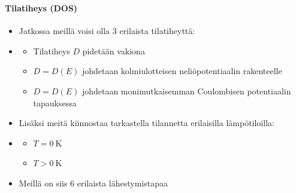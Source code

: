 \begin{frame}
\frametitle{\texorpdfstring{\culine[\sectiontitleulinecolor]{\sectiontitle}}{\sectiontitle} }
\framesubtitle{Tilatiheys (DOS)}
\appear{}

\begin{itemize}
	\item Jatkossa meillä voisi olla 3 erilaista tilatiheyttä:
\item[] \begin{itemize}
	\item Tilatiheys $D$ pidetään vakiona 
\item $D=D(E)$ johdetaan kolmiulotteisen neliöpotentiaalin rakenteelle 
\item $D=D(E)$ johdetaan monimutkaisemman Coulombisen potentiaalin tapauksessa 

\end{itemize}

\item Lisäksi meitä kiinnostaa tarkastella tilannetta erilaisilla lämpötiloilla:
\item[] \begin{itemize}
	\item $T=0 \mathrm{~K}$
	\item $T>0 \mathrm{~K}$
	\end{itemize}
	
	\item Meillä on siis 6 erilaista lähestymistapaa 

\end{itemize}

\endofslide 
\end{frame}


